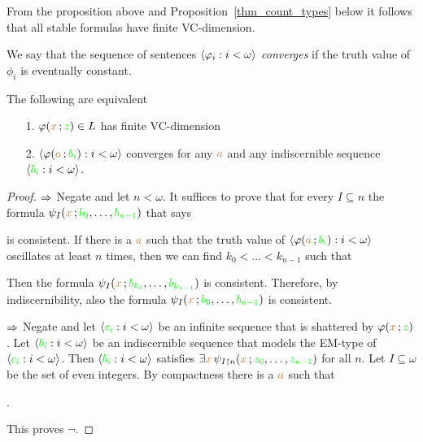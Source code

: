 From the proposition above and Proposition~\ref{thm_count_types} below it follows that all stable formulas have finite VC-dimension.

We say that the sequence of sentences $\langle\varphi_i:i<\omega\rangle$ \emph{converges\/} if the truth value of $\phi_i$ is eventually constant.

\begin{lemma}\label{lem_altrank}
The following are equivalent
\begin{itemize}
\item[1.] $\varphi({\color{brown} x}\,;{\color{green} z})\in L$ has finite VC-dimension
\item[2.] $\langle\varphi({\color{brown} a}\,;{\color{green} b_i}):i<\omega\rangle$ converges for any ${\color{brown} a}$ and any indiscernible sequence $\langle{\color{green}b_i}:i<\omega\rangle$.
\end{itemize}
\end{lemma}

\begin{proof}
$\Rightarrow$ Negate  and let $n<\omega$. It suffices to prove that for every $I\subseteq n$ the formula $\psi_{I}({\color{brown} x}\,;{\color{green} b_0},\dots,{\color{green} b_{n-1}} )$ that says 


is consistent. If there is a ${\color{brown} a}$ such that the truth value of $\langle\varphi({\color{brown} a}\,;{\color{green} b_i}):i<\omega\rangle$ oscillates at least $n$ times, then we can find $k_0<\dots<k_{n-1}$ such that 


Then the formula $\psi_{I}({\color{brown} x}\,;{\color{green} b_{k_0}},\dots,{\color{green} b_{k_{n-1}}})$ is consistent.
Therefore, by indiscernibility, also the formula  $\psi_{I}({\color{brown} x}\,;{\color{green} b_0},\dots,{\color{green} b_{n-1}})$ is consistent.

$\Rightarrow$
Negate  and let  $\langle{\color{green}c_i}:i<\omega\rangle$ be an infinite sequence that is shattered by $\varphi({\color{brown} x}\,;{\color{green} z})$.
Let  $\langle{\color{green}b_i}:i<\omega\rangle$ be an indiscernible sequence that models the EM-type of $\langle{\color{green}c_i}:i<\omega\rangle$. Then $\langle{\color{green}b_i}:i<\omega\rangle$ satisfies $\exists{\color{brown}x}\,\psi_{I\restriction n}({\color{brown} x}\,;{\color{green} z_0},\dots,{\color{green} z_{n-1}})$ for all $n$. 
Let $I\subseteq\omega$ be the set of even integers.
By compactness there is a ${\color{brown} a}$ such that

.

This proves $\neg$.
\end{proof}

